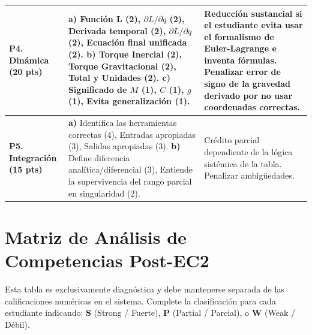 \documentclass[11pt, a4paper, landscape]{article}
\begin{document}
{\begin{tabularx}{\textwidth}{|>{\hsize=0.8\hsize\raggedright\arraybackslash}X|>{\hsize=1.2\hsize\raggedright\arraybackslash}X|>{\hsize=1\hsize\raggedright\arraybackslash}X|}
\textbf{P4. Dinámica (20 pts)} & 
\textbf{a)} Función L (2), $\partial L/\partial \dot{q}$ (2), Derivada temporal (2), $\partial L/\partial q$ (2), Ecuación final unificada (2). \newline
\textbf{b)} Torque Inercial (2), Torque Gravitacional (2), Total y Unidades (2). \newline
\textbf{c)} Significado de $M$ (1), $C$ (1), $g$ (1), Evita generalización (1). & 
Reducción sustancial si el estudiante evita usar el formalismo de Euler-Lagrange e inventa fórmulas. Penalizar error de signo de la gravedad derivado por no usar coordenadas correctas. \\ \hline

\textbf{P5. Integración (15 pts)} & 
\textbf{a)} Identifica las herramientas correctas (4), Entradas apropiadas (3), Salidas apropiadas (3). \newline
\textbf{b)} Define diferencia analítica/diferencial (3), Entiende la supervivencia del rango parcial en singularidad (2). & 
Crédito parcial dependiente de la lógica sistémica de la tabla. Penalizar ambigüedades. \\ \hline

\end{tabularx}
}

\newpage

\section*{Matriz de Análisis de Competencias Post-EC2}

\begin{tcolorbox}[colback=white, colframe=black, title=\textbf{Instrucción de Registro Docente}, left=1mm, right=1mm, top=1mm, bottom=1mm]
    Esta tabla es exclusivamente diagnóstica y debe mantenerse separada de las calificaciones numéricas en el sistema. Complete la clasificación para cada estudiante indicando: \textbf{S} (Strong / Fuerte), \textbf{P} (Partial / Parcial), o \textbf{W} (Weak / Débil).
\end{tcolorbox}
\end{document}
